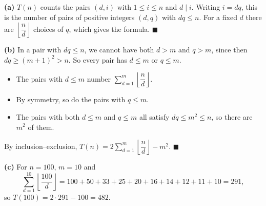 \textbf{(a)} $T(n)$ counts the pairs $(d,i)$ with $1\le i\le n$ and $d\mid i$. Writing $i=dq$, this is the number of pairs of positive integers $(d,q)$ with $dq\le n$. For a fixed $d$ there are $\left\lfloor\dfrac nd\right\rfloor$ choices of $q$, which gives the formula. $\blacksquare$

\textbf{(b)} In a pair with $dq\le n$, we cannot have both $d>m$ and $q>m$, since then $dq\ge(m+1)^2>n$. So every pair has $d\le m$ or $q\le m$.
\begin{itemize}
\item The pairs with $d\le m$ number $\displaystyle\sum_{d=1}^m\left\lfloor\dfrac nd\right\rfloor$.
\item By symmetry, so do the pairs with $q\le m$.
\item The pairs with both $d\le m$ and $q\le m$ all satisfy $dq\le m^2\le n$, so there are $m^2$ of them.
\end{itemize}
By inclusion--exclusion, $T(n)=2\displaystyle\sum_{d=1}^m\left\lfloor\dfrac nd\right\rfloor-m^2$. $\blacksquare$

\textbf{(c)} For $n=100$, $m=10$ and
\[\sum_{d=1}^{10}\left\lfloor\dfrac{100}d\right\rfloor=100+50+33+25+20+16+14+12+11+10=291,\]
so $T(100)=2\cdot291-100=\boxed{482}$.
